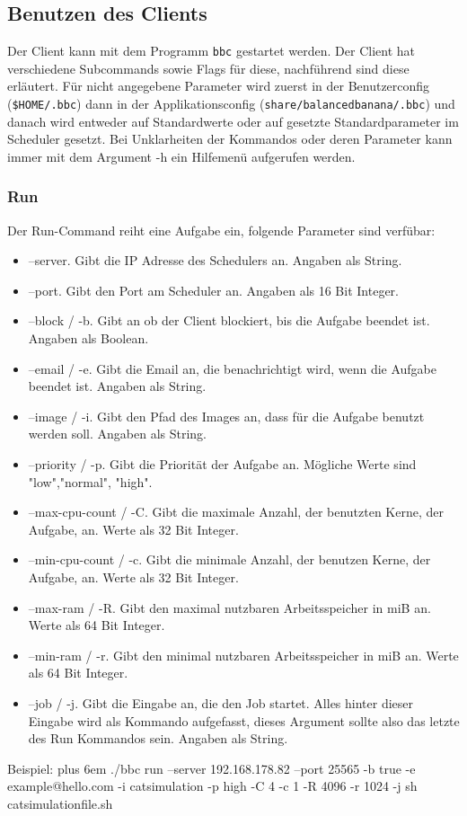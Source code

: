 \documentclass[a4paper,12pt]{article}
\makeatletter
\newenvironment{mycode}
 {\def\@xobeysp{\ }\verbatim\rightskip=0pt plus 6em\relax}
 {\endverbatim}
\makeatother
\begin{document}
\subsection{Benutzen des Clients}
Der Client kann mit dem Programm \texttt{bbc} gestartet werden. Der Client hat verschiedene Subcommands sowie Flags für diese, nachführend sind diese erläutert. Für nicht angegebene Parameter wird zuerst in der Benutzerconfig (\texttt{\$HOME/.bbc}) dann in der Applikationsconfig (\texttt{share/balancedbanana/.bbc}) und danach wird entweder auf Standardwerte oder auf gesetzte Standardparameter im Scheduler gesetzt.
Bei Unklarheiten der Kommandos oder deren Parameter kann immer mit dem Argument -h ein Hilfemenü aufgerufen werden.
\subsubsection{Run}
Der Run-Command reiht eine Aufgabe ein, folgende Parameter sind verfübar:
\begin{itemize}
\item --server. Gibt die IP Adresse des Schedulers an. Angaben als String.
\item --port. Gibt den Port am Scheduler an. Angaben als 16 Bit Integer.	
\item --block / -b. Gibt an ob der Client blockiert, bis die Aufgabe beendet ist. Angaben als Boolean.
\item --email / -e. Gibt die Email an, die benachrichtigt wird, wenn die Aufgabe beendet ist. Angaben als String.
\item --image / -i. Gibt den Pfad des Images an, dass für die Aufgabe benutzt werden soll.  Angaben als String.
\item --priority / -p. Gibt die Priorität der Aufgabe an. Mögliche Werte sind "low","normal", "high".
\item --max-cpu-count / -C. Gibt die maximale Anzahl, der benutzten Kerne, der Aufgabe, an. Werte als 32 Bit Integer.
\item --min-cpu-count / -c. Gibt die minimale Anzahl, der benutzen Kerne, der Aufgabe, an. Werte als 32 Bit Integer.
\item --max-ram / -R. Gibt den maximal nutzbaren Arbeitsspeicher in miB an. Werte als 64 Bit Integer.
\item --min-ram / -r. Gibt den minimal nutzbaren Arbeitsspeicher in miB an. Werte als 64 Bit Integer.
\item --job / -j. Gibt die Eingabe an, die den Job startet. Alles hinter dieser Eingabe wird als Kommando aufgefasst, dieses Argument sollte also das letzte des Run Kommandos sein. Angaben als String.
\end{itemize}
Beispiel: \newline
\begin{mycode}
	./bbc run --server 192.168.178.82 --port 25565 -b true -e example@hello.com -i catsimulation -p high -C 4 -c 1 -R 4096 -r 1024 -j sh catsimulationfile.sh
\end{mycode}
\end{document}
